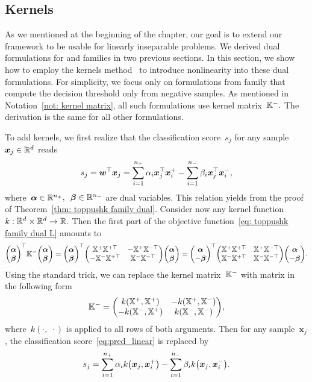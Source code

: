 \subsection{Kernels}

As we mentioned at the beginning of the chapter, our goal is to extend our framework to be usable for linearly inseparable problems. We derived dual formulations for \TopPushK and \PatMat families in two previous sections. In this section, we show how to employ the kernels method~\cite{scholkopf2001learning} to introduce nonlinearity into these dual formulations. For simplicity, we focus only on formulations from \TopPushK family that compute the decision threshold only from negative samples. As mentioned in Notation~\ref{not: kernel matrix}, all such formulations use kernel matrix~$\mathbb{K}^{-}.$ The derivation is the same for all other formulations.

To add kernels, we first realize that the classification score~$s_j$ for any sample~$\bm{x}_j \in \mathbb{R}^d$ reads 
\begin{equation}\label{eq:pred_linear}
  s_j
    = \bm{w}^{\top} \bm{x}_j
    = \sum_{i = 1}^{n_{+}} \alpha_i \bm{x}_j^{\top} \bm{x}_i^+ - \sum_{i = 1}^{n_{-}} \beta_i \bm{x}_j^{\top} \bm{x}_i^-,
\end{equation}
where~$\bm{\alpha} \in \mathbb{R}^{n_{+}},$~$\bm{\beta} \in \mathbb{R}^{n_{-}}$ are dual variables. This relation yields from the proof of Theorem~\ref{thm: toppushk family dual}. Consider now any kernel function~$k: \mathbb{R}^d \times \mathbb{R}^d \to \mathbb{R}.$ Then the first part of the objective function~\eqref{eq: toppushk family dual L} amounts to
\begin{equation*}
  \vecab^\top \Kneg \vecab
    = \vecab^\top \Matrix{\X^+ \X^{+\top} & -\X^+ \X^{-\top} \\ -\X^- \X^{+\top} & \X^- \X^{-\top} } \vecab
    = \Matrix{\bm{\alpha} \\ -\bm{\beta}}^\top \Matrix{\X^+ \X^{+\top} & \X^+ \X^{-\top} \\ \X^- \X^{+\top} & \X^- \X^{-\top} }\Matrix{\bm{\alpha} \\ -\bm{\beta}}.
\end{equation*}
Using the standard trick, we can replace the kernel matrix~$\mathbb{K}^{-}$ with matrix in the following form
\begin{equation}\label{eq:kernel_nonlinear}
  \Kneg = \Matrix{k\Brac{\X^+, \X^{+}} & -k\Brac{\X^+, \X^{-}} \\ -k\Brac{\X^-, \X^{+}} & k\Brac{\X^-, \X^{-}}},
\end{equation}
where~$k(\cdot,\; \cdot)$ is applied to all rows of both arguments. Then for any sample~$\bm{x}_j$, the classification score~\eqref{eq:pred_linear} is replaced by
\begin{equation}\label{eq: scores dual kernel}
  s_j = \sum_{i = 1}^{\npos} \alpha_i k\Brac{\bm{x}_j, \bm{x}^+_i} - \sum_{i = 1}^{\nneg} \beta_i k\Brac{\bm{x}_j, \bm{x}^-_i}.
\end{equation}

